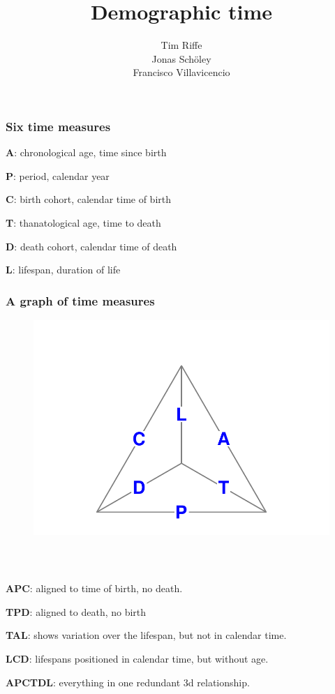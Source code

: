 \documentclass[20pt]{beamer}
\title{Demographic time}
\subtitle{Tim Riffe\\ Jonas Sch{\"o}ley\\
Francisco Villavicencio}
\begin{document}
\begin{frame}
	\titlepage
\end{frame}

\begin{frame}%
\frametitle{Six time measures}
  \begin{description}
    \item<1->{\textbf{A}:} chronological age, time since birth
    \item<2->{\textbf{P}:} period, calendar year
    \item<3->{\textbf{C}:} birth cohort, calendar time of birth
    \item<4->{\textbf{T}:} thanatological age, time to death
    \item<5->{\textbf{D}:} death cohort, calendar time of death
    \item<6->{\textbf{L}:} lifespan, duration of life
    \end{description}
\end{frame}

\begin{frame}
\frametitle{A graph of time measures}
\begin{figure}[b]
    \centering
    \includegraphics{Figures/Tetra1prg.pdf}
\end{figure} 
\end{frame}

\begin{frame}%
\frametitle{~}
  \begin{description}
    \item<1->{\textbf{APC}:} aligned to time of birth, no death.
    \item<2->{\textbf{TPD}:} aligned to death, no birth
    \item<3->{\textbf{TAL}:} shows variation over the lifespan, but not in
    calendar time.
    \item<4->{\textbf{LCD}:} lifespans positioned in calendar time, but without
    age.
    \item<5->{\textbf{APCTDL}:} everything in one redundant 3d relationship.
  \end{description}
\end{frame}
\end{document}
